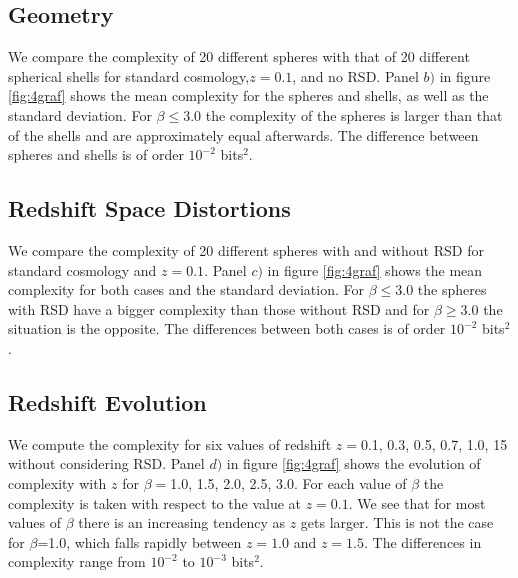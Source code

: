 \documentclass[fleqn,usenatbib]{mnras}
\begin{document}
\subsection{Geometry}

We compare the complexity of 20 different spheres with that of 20
different spherical shells for standard cosmology,$z=0.1$, and no
RSD. Panel $b)$ in figure \ref{fig:4graf} shows the mean complexity
for the spheres and shells, as well as the standard deviation. For
$\beta\leq3.0$ the complexity of the spheres is larger than that of
the shells and are approximately equal afterwards. The difference
between spheres and shells is of order $10^{-2}$ bits$^{2}$. 




\subsection{Redshift Space Distortions}

We compare the complexity of 20 different spheres with and without RSD
for standard cosmology and $z=0.1$. Panel $c)$ in figure
\ref{fig:4graf} shows the mean complexity for both cases and the
standard deviation. For $\beta\leq3.0$ the spheres with RSD have a
bigger complexity than those without RSD and for $\beta\geq3.0$ the
situation is the opposite. The differences between both cases is of
order $10^{-2}$ bits$^2$. 


\subsection{Redshift Evolution}
We compute the complexity for six values of redshift $z=$0.1, 0.3,
0.5, 0.7, 1.0, 15 without considering RSD. Panel $d)$ in figure
\ref{fig:4graf} shows the evolution of complexity with $z$ for
$\beta=$1.0, 1.5, 2.0, 2.5, 3.0. For each value of $\beta$ the
complexity is taken with respect to the value at $z=0.1$. We see that
for most values of $\beta$ there is an increasing tendency as $z$ gets
larger. This is not the case for $\beta$=1.0, which falls rapidly
between $z=1.0$ and $z=1.5$. The differences in complexity range from
$10^{-2}$ to $10^{-3}$ bits$^2$. 
\end{document}
